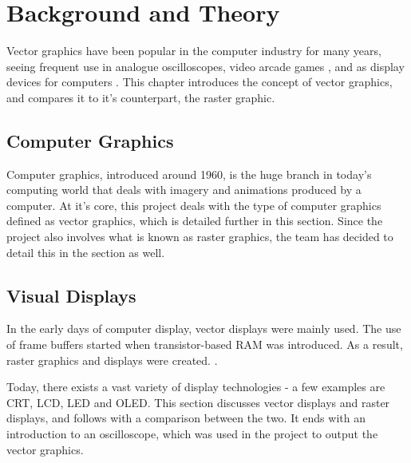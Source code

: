 \chapter{Background and Theory}

Vector graphics have been popular in the computer industry for many years,
seeing frequent use in analogue oscilloscopes, video arcade games \cite{astroids},
and as display devices for computers \cite{ibm2250}. 
This chapter introduces the concept of vector graphics, and compares it to it's counterpart, the raster graphic.

\section{Computer Graphics}
Computer graphics, introduced around 1960\cite[sec. 1.1.1]{graphics-visualization-algorithms}, is the huge branch in today's computing world that deals with imagery and animations produced by a computer.
At it's core, this project deals with the type of computer graphics defined as vector graphics, which is detailed further in this section. 
Since the project also involves what is known as raster graphics, the team has decided to detail this in the section as well.





\section{Visual Displays}
In the early days of computer display, vector displays were mainly used.
The use of frame buffers started when transistor-based RAM was introduced.
As a result, raster graphics and displays were created. \cite[sec. 1.1]{graphics-visualization-algorithms}.

Today, there exists a vast variety of display technologies - a few examples are CRT, LCD, LED and OLED.
This section discusses vector displays and raster displays, and follows with a comparison between the two. It ends with an introduction to an oscilloscope, which was used in the project to output the vector graphics.






